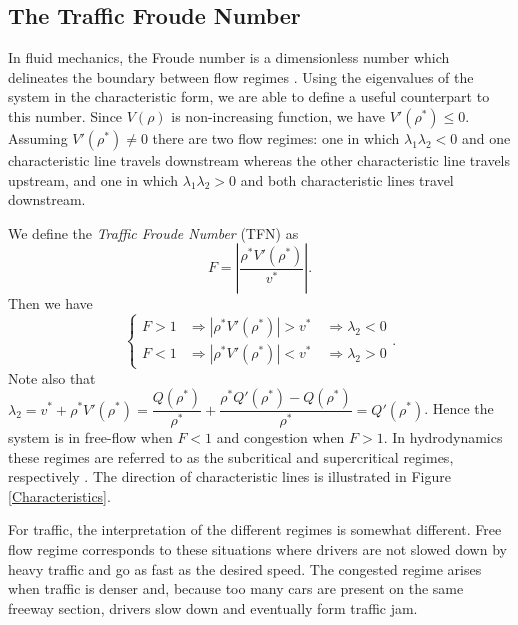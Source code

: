 \documentclass[a4paper, 10pt, conference]{ieeeconf}      %
\begin{document}
\subsection{The Traffic Froude Number}
In fluid mechanics, the Froude number is a dimensionless number which delineates the boundary between flow regimes \cite{Sturm, litrico2009modeling}. Using the eigenvalues of the system in the characteristic form, we are able to define a useful counterpart to this number.
Since $V(\rho)$ is non-increasing function, we have $V'(\rho^*) \leq 0$. Assuming $V'(\rho^*) \neq 0$ there are two flow regimes: one in which $\lambda_1 \lambda_2 < 0$ and one characteristic line travels downstream whereas the other characteristic line travels upstream, and one in which $\lambda_1 \lambda_2 > 0$ and both characteristic lines travel downstream.

We define the \textit{Traffic Froude Number} (TFN) as
\begin{equation}
F = \left\lvert\dfrac{\rho^*V'( \rho^*)}{v^*}\right\rvert.
\end{equation} 
Then we have
\begin{equation*}
\begin{cases}
F > 1 &\Rightarrow |\rho^*V'(\rho^*)| > v^* \quad \Rightarrow \lambda_2  <0 \\
F < 1 &\Rightarrow |\rho^*V'(\rho^*)| < v^* \quad \Rightarrow \lambda_2 > 0
\end{cases}.
\end{equation*}
Note also that $\lambda_2 = v^* + \rho^* V'( \rho^*) = \dfrac{Q(\rho^*)}{\rho^*} + \dfrac{\rho^*Q'(\rho^*)-Q(\rho^*)}{\rho^*} = Q'(\rho^*)$. Hence the system is in free-flow when $F<1$ and congestion when $F>1$. In hydrodynamics these regimes are referred to as the subcritical and supercritical regimes, respectively \cite{litrico2009modeling}. The direction of characteristic lines is illustrated in Figure \ref{Characteristics}.

For traffic, the interpretation of the different regimes is somewhat different. Free flow regime corresponds to these situations where drivers are not slowed down by heavy traffic and go as fast as the desired speed. The congested regime arises when traffic is denser and, because too many cars are present on the same freeway section, drivers slow down and eventually form traffic jam.
\end{document}
